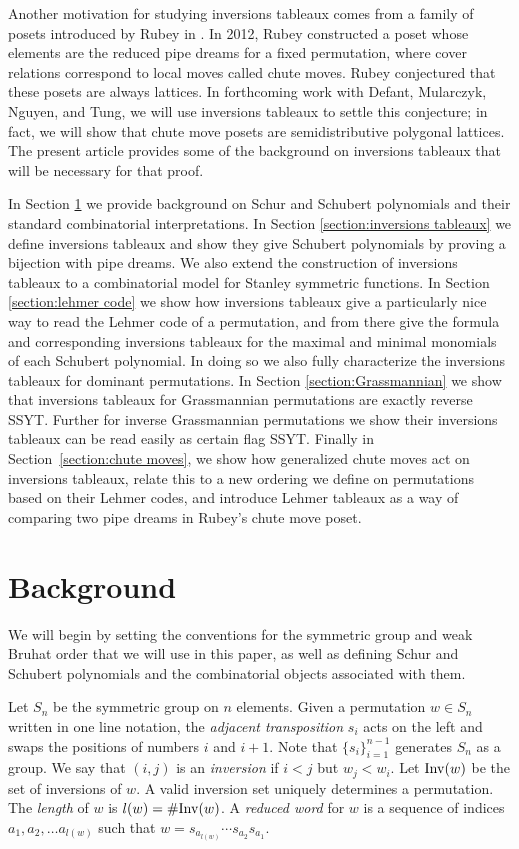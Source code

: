 \documentclass{article}
\theoremstyle{definition}
\begin{document}
Another motivation for studying inversions tableaux comes from a family of posets introduced by Rubey in \cite{RUBEY}. In 2012, Rubey constructed a poset whose elements are the reduced pipe dreams for a fixed permutation, where cover relations correspond to local moves called chute moves. Rubey conjectured that these posets are always lattices. In forthcoming work with Defant, Mularczyk, Nguyen, and Tung, we will use inversions tableaux to settle this conjecture; in fact, we will show that chute move posets are semidistributive polygonal lattices. The present article provides some of the background on inversions tableaux that will be necessary for that proof. 


In Section \ref{section:background} we provide background on Schur and Schubert polynomials and their standard combinatorial interpretations.
In Section \ref{section:inversions tableaux} we define inversions tableaux and show they give Schubert polynomials by proving a bijection with pipe dreams. We also extend the construction of inversions tableaux to a combinatorial model for Stanley symmetric functions.
In Section \ref{section:lehmer code} we show how inversions tableaux give a particularly nice way to read the Lehmer code of a permutation, and from there give the formula and corresponding inversions tableaux for the maximal and minimal monomials of each Schubert polynomial. In doing so we also fully characterize the inversions tableaux for dominant permutations. 
In Section \ref{section:Grassmannian} we show that inversions tableaux for Grassmannian permutations are exactly reverse SSYT. Further for inverse Grassmannian permutations we show their inversions tableaux can be read easily as certain flag SSYT.
Finally in Section~\ref{section:chute moves}, we show how generalized chute moves act on inversions tableaux, relate this to a new ordering we define on permutations based on their Lehmer codes, and introduce Lehmer tableaux as a way of comparing two pipe dreams in Rubey's chute move poset.

\section{Background}
\label{section:background}
We will begin by setting the conventions for the symmetric group and weak Bruhat order that we will use in this paper, as well as defining Schur and Schubert polynomials and the combinatorial objects associated with them.

Let $S_n$ be the symmetric group on $n$ elements. Given a permutation $w\in S_n$ written in one line notation, the \textit{adjacent transposition} $s_i$ acts on the left and swaps the positions of numbers $i$ and $i+1$. Note that $\{s_i\}_{i=1}^{n-1}$ generates $S_n$ as a group. We say that $(i,j)$ is an \emph{inversion} if $i<j$ but $w_j < w_i$. Let $\mathrm{Inv}(w)$ be the set of inversions of $w$. A valid inversion set uniquely determines a permutation. The \emph{length} of $w$ is $l(w) = \# \mathrm{Inv}(w)$. A \emph{reduced word} for $w$ is a sequence of indices $a_1, a_2, \dots a_{l(w)}$ such that $w = s_{a_{l(w)}} \cdots s_{a_2} s_{a_1}$.
\end{document}
